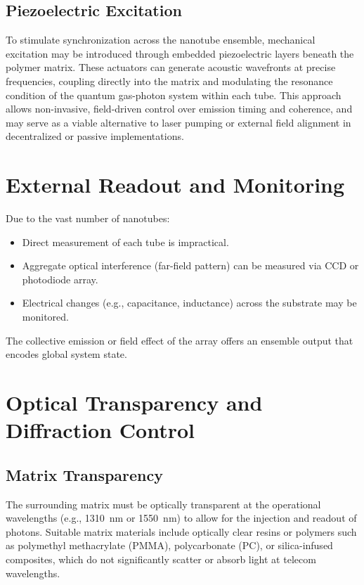 \documentclass[11pt]{article}
\begin{document}
	
	\subsection{Piezoelectric Excitation}
	To stimulate synchronization across the nanotube ensemble, mechanical excitation may be introduced through embedded piezoelectric layers beneath the polymer matrix. These actuators can generate acoustic wavefronts at precise frequencies, coupling directly into the matrix and modulating the resonance condition of the quantum gas-photon system within each tube. This approach allows non-invasive, field-driven control over emission timing and coherence, and may serve as a viable alternative to laser pumping or external field alignment in decentralized or passive implementations.
	\section{External Readout and Monitoring}
	Due to the vast number of nanotubes:
	\begin{itemize}
		\item Direct measurement of each tube is impractical.
		\item Aggregate optical interference (far-field pattern) can be measured via CCD or photodiode array.
		\item Electrical changes (e.g., capacitance, inductance) across the substrate may be monitored.
	\end{itemize}
	The collective emission or field effect of the array offers an ensemble output that encodes global system state.
	
	\section{Optical Transparency and Diffraction Control}
	\subsection{Matrix Transparency}
	The surrounding matrix must be optically transparent at the operational wavelengths (e.g., \SI{1310}{\nano\meter} or \SI{1550}{\nano\meter}) to allow for the injection and readout of photons. Suitable matrix materials include optically clear resins or polymers such as polymethyl methacrylate (PMMA), polycarbonate (PC), or silica-infused composites, which do not significantly scatter or absorb light at telecom wavelengths.
	
\end{document}
